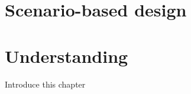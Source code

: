 %
\chapter{Scenario-based design}







\chapter{Understanding}
Introduce this chapter











		
		
		
